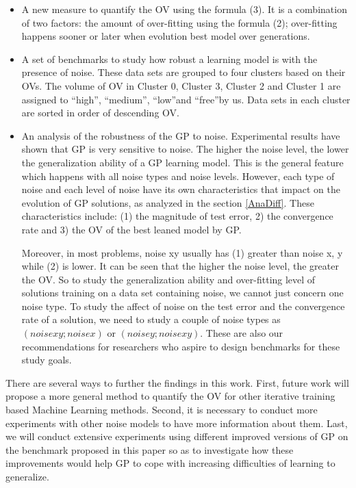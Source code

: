 \begin{itemize}
\item A new measure to quantify the OV using the formula (3). It is a combination of two factors: the amount of over-fitting using the formula (2); over-fitting happens sooner or later when evolution best model over generations.

\item A set of benchmarks to study how robust a learning model is with the presence of noise. These data sets are grouped to four clusters based on their OVs. The volume of OV in Cluster 0, Cluster 3, Cluster 2 and Cluster 1 are assigned to \textquotedblleft high\textquotedblright, \textquotedblleft medium\textquotedblright, \textquotedblleft low\textquotedblright and \textquotedblleft free\textquotedblright by us. Data sets in each cluster are sorted in order of descending OV.

\item An analysis of the robustness of the GP to noise. Experimental results have shown that GP is very sensitive to noise. The higher the noise level, the lower the generalization ability of a GP learning model. This is the general feature which happens with all noise types and noise levels. However, each type of noise and each level of noise have its own characteristics that impact on the evolution of GP solutions, as analyzed in the section \ref{AnaDiff}. These characteristics include: (1) the magnitude of test error, 2) the convergence rate and 3) the OV of the best leaned model by GP. 

Moreover, in most problems, noise xy usually has (1) greater than noise x, y while (2) is lower. It can be seen that the higher the noise level, the greater the OV. So to study the generalization ability and over-fitting level of solutions training on a data set containing noise, we cannot just concern one noise type. To study the affect of noise on the test error and the convergence rate of a solution, we need to study a couple of noise types as $(noise xy; noise x)$ or $(noise y; noise xy)$. These are also our recommendations for researchers who aspire to  design benchmarks for these study goals.
\end{itemize} \par

There are several ways to further the findings in this work. First, future work will propose a more general method to quantify the OV for other iterative training based Machine Learning methods.  Second, it is necessary to conduct more experiments with other noise models to have more information about them. Last, we will conduct extensive experiments using different improved versions of GP on the benchmark proposed in this paper so as to investigate how these improvements would help GP to cope with increasing difficulties of learning to generalize.

